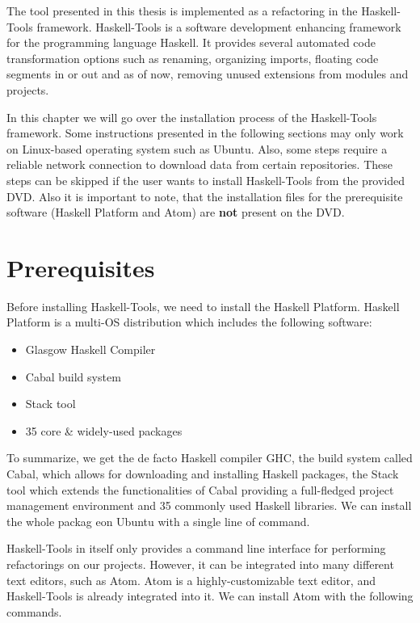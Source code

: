 \documentclass[main.tex]{subfiles}
\begin{document}
	
	The tool presented in this thesis is implemented as a refactoring in the Haskell-Tools framework. Haskell-Tools is a software development enhancing framework for the programming language Haskell. It provides several automated code transformation options such as renaming, organizing imports, floating code segments in or out and as of now, removing unused extensions from modules and projects.
	
	In this chapter we will go over the installation process of the Haskell-Tools framework. Some instructions presented in the following sections may only work on Linux-based operating system such as Ubuntu. Also, some steps require a reliable network connection to download data from certain repositories. These steps can be skipped if the user wants to install Haskell-Tools from the provided DVD. Also it is important to note, that the installation files for the prerequisite software (Haskell Platform and Atom) are \textbf{not} present on the DVD.
	
	\section{Prerequisites}
	
	Before installing Haskell-Tools, we need to install the Haskell Platform. Haskell Platform is a multi-OS distribution which includes the following software:
	
	\begin{itemize}
		\item Glasgow Haskell Compiler
		\item Cabal build system
		\item Stack tool
		\item 35 core \& widely-used packages
	\end{itemize}
	
	To summarize, we get the de facto Haskell compiler GHC, the build system called Cabal, which allows for downloading and installing Haskell packages, the Stack tool which extends the functionalities of Cabal providing a full-fledged project management environment and 35 commonly used Haskell libraries. We can install the whole packag eon Ubuntu with a single line of command.
	
	
	Haskell-Tools in itself only provides a command line interface for performing refactorings on our projects. However, it can be integrated into many different text editors, such as Atom. Atom is a highly-customizable text editor, and Haskell-Tools is already integrated into it. We can install Atom with the following commands.
	
\end{document}

